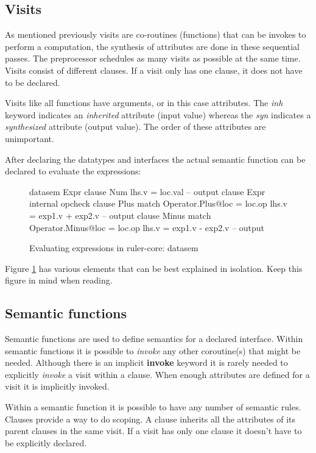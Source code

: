 \subsection{Visits}
As mentioned previously visits are co-routines (functions) that can be invokes to perform a computation, the synthesis of attributes are done in these sequential passes. The preprocessor schedules as many visits as possible at the same time. Visits consist of different clauses. If a visit only has one clause, it does not have to be declared. 

Visits like all functions have arguments, or in this case attributes. The \emph{inh} keyword indicates an \emph{inherited} attribute (input value) whereas the \emph{syn} indicates a \emph{synthesized} attribute (output value). The order of these attributes are unimportant.

After declaring the datatypes and interfaces the actual semantic function can be declared to evaluate the expressions:

\begin{figure}[H]
\begin{code}
datasem Expr
   clause Num
     lhs.v = loc.val -- output
   clause Expr
     internal opcheck
       clause Plus
         match Operator.Plus@loc = loc.op
         lhs.v = exp1.v + exp2.v -- output
       clause Minus
         match Operator.Minus@loc = loc.op
         lhs.v = exp1.v - exp2.v -- output
\end{code}
\caption{Evaluating expressions in ruler-core: datasem}
\label{example:tutorial1:datasem}
\end{figure}

Figure \ref{example:tutorial1:datasem} has various elements that can be best explained in isolation. Keep this figure in mind when reading.

\subsection{Semantic functions}
\label{semantics}
Semantic functions are used to define semantics for a declared interface. Within semantic functions it is possible to \emph{invoke} any other coroutine(s) that might be needed. Although there is an implicit \textbf{invoke} keyword it is rarely needed to explicitly \emph{invoke} a visit within a clause. When enough attributes are defined for a visit it is implicitly invoked.

Within a semantic function it is possible to have any number of semantic rules. Clauses provide a way to do scoping. A clause inherits all the attributes of its parent clauses in the same visit. If a visit has only one clause it doesn't have to be explicitly declared. 

